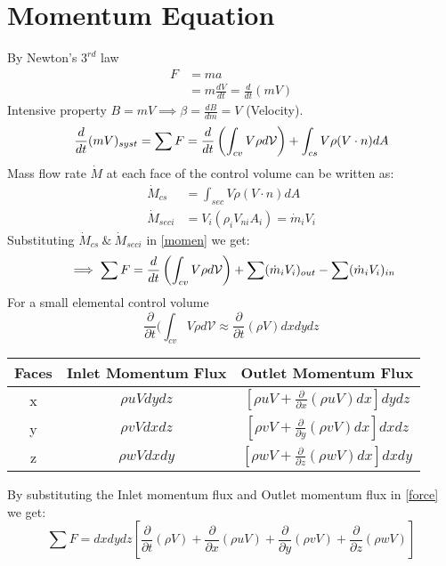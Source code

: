 \documentclass{article}
\begin{document}
\section*{Momentum Equation}
By Newton's $3^{rd}$ law 
\begin{align*}
    F &= ma \\
    &= m \frac{dV}{dt} =\frac{d}{dt}(mV)
\end{align*}
Intensive property $B=mV \implies \beta=\frac{dB}{dm}=V$ (Velocity).
\begin{equation}{\label{momen}}
    \frac{d}{dt}(mV)_{syst}=\sum F = \frac{d}{dt}\left(\int_{cv}V\rho d\mathcal{V}\right)+\int_{cs}V\rho(V\cdot n)dA
\end{equation}
Mass flow rate $\dot{M}$ at each face of the control volume can be written as:
\begin{align*}
    \dot{M}_{cs} &= \int_{sec}V\rho(V\cdot n)dA \\
    \dot{M}_{seci} &= V_i(\rho_iV_{ni}A_i)=\dot{m}_iV_i
\end{align*}
Substituting $\dot{M}_{cs}\ \&\ \dot{M}_{seci}$ in \ref{momen} we get:
\begin{equation}{\label{force}}
    \implies \sum F = \frac{d}{dt}\left(\int_{cv} V\rho d \mathcal{V}\right)+\sum(\dot{m}_iV_i)_{out}-\sum(\dot{m}_iV_{i})_{in}
\end{equation}
For a small elemental control volume
$$\frac{\partial}{\partial{t}}(\int_{cv}V\rho d\mathcal{V}\approx\frac{\partial}{\partial{t}}(\rho V)dxdydz$$
\begin{center}
\begin{tabular}{c c c} \hline
    \textbf{Faces} & \textbf{Inlet Momentum Flux} & \textbf{Outlet Momentum Flux} \\ \hline 
     x & $\rho uVdydz$ & $\left[\rho uV+ \frac{\partial}{\partial{x}}(\rho uV)dx \right]dydz$ \\
     y & $\rho vVdxdz$ & $\left[\rho vV+ \frac{\partial}{\partial{y}}(\rho vV)dx \right]dxdz$ \\
     z & $\rho wVdxdy$ & $\left[\rho wV+ \frac{\partial}{\partial{z}}(\rho wV)dx \right]dxdy$ \\ \hline
\end{tabular}
\end{center}
By substituting the Inlet momentum flux and Outlet momentum flux in \ref{force} we get:
\begin{equation}
    \sum{F}=dxdydz\left[\frac{\partial}{\partial{t}}(\rho V)+\frac{\partial}{\partial{x}}(\rho uV)+\frac{\partial}{\partial{y}}(\rho vV)+\frac{\partial}{\partial{z}}(\rho wV)\right]
\end{equation}
\end{document}
